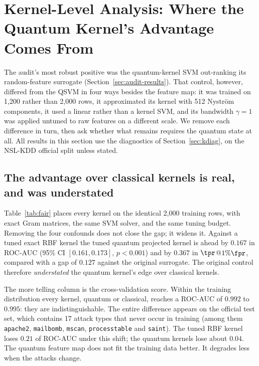 \section{Kernel-Level Analysis: Where the Quantum Kernel's Advantage Comes From}\label{sec:kernel}
The audit's most robust positive was the quantum-kernel SVM out-ranking its random-feature surrogate
(Section~\ref{sec:audit-results}). That control, however, differed from the QSVM in four ways besides the
feature map: it was trained on 1{,}200 rather than 2{,}000 rows, it approximated its kernel with 512
Nystr\"om components, it used a linear rather than a kernel SVM, and its bandwidth $\gamma=1$ was applied
untuned to raw features on a different scale. We remove each difference in turn, then ask whether what
remains requires the quantum state at all. All results in this section use the diagnostics of
Section~\ref{sec:kdiag}, on the NSL-KDD official split unless stated.

\subsection{The advantage over classical kernels is real, and was understated}
Table~\ref{tab:fair} places every kernel on the identical 2{,}000 training rows, with exact Gram matrices,
the same SVM solver, and the same tuning budget. Removing the four confounds does not close the gap; it
widens it. Against a tuned exact RBF kernel the tuned quantum projected kernel is ahead by $0.167$ in
ROC-AUC (95\% CI $[0.161,0.173]$, $p<0.001$) and by $0.367$ in $\tpr$@$1\%\fpr$, compared with a gap of
$0.127$ against the original surrogate. The original control therefore \emph{understated} the quantum
kernel's edge over classical kernels.

The more telling column is the cross-validation score. Within the training distribution every kernel,
quantum or classical, reaches a ROC-AUC of $0.992$ to $0.995$: they are indistinguishable. The entire
difference appears on the official test set, which contains 17 attack types that never occur in training
(among them \texttt{apache2}, \texttt{mailbomb}, \texttt{mscan}, \texttt{processtable} and \texttt{saint}).
The tuned RBF kernel loses $0.21$ of ROC-AUC under this shift; the quantum kernels lose about $0.04$.
The quantum feature map does not fit the training data better. It degrades less when the attacks change.

